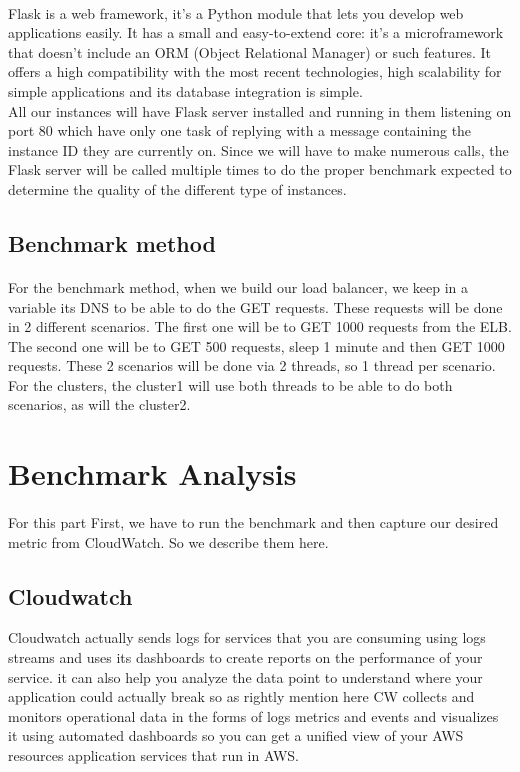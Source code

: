 \documentclass[12pt]{article}
\begin{document}
		\paragraph{} Flask is a web framework, it’s a Python module that lets you develop web applications easily. It has a small 
		and easy-to-extend core: it’s a microframework that doesn’t include an ORM (Object Relational Manager) or such features. It 
		offers a high compatibility with the most recent technologies, high scalability for simple applications and its database 
		integration is simple. \\

		All our instances will have Flask server installed and running in them listening on port 80 which have only one task of replying
		with a message containing the instance ID they are currently on. Since we will have to make numerous calls, the Flask server 
		will be called multiple times to do the proper benchmark expected to determine the quality of the different type of instances.
		\bigskip

	\subsection{Benchmark method}
		\paragraph{} For the benchmark method, when we build our load balancer, we keep in a variable its DNS to be able to do the GET requests.
		These requests will be done in 2 different scenarios. The first one will be to GET 1000 requests from the ELB. The second one will be to 
		GET 500 requests, sleep 1 minute and then GET 1000 requests. These 2 scenarios will be done via 2 threads, so 1 thread per scenario. For 
		the clusters, the cluster1 will use both threads to be able to do both scenarios, as will the cluster2.
		\bigskip
		\pagebreak

\section{Benchmark Analysis} \label{sec:benchmark}
		\paragraph{} For  this part First, we have to run the benchmark and then capture our desired metric from CloudWatch. So we describe them here.
        \subsection{Cloudwatch}
        Cloudwatch actually sends logs for services that you are consuming using logs streams and uses its dashboards to create reports on the 	
		performance of your service. it can also help you analyze the data point to understand where your application could actually break so 
		as rightly mention here CW collects and monitors operational data in the forms of logs metrics and events and visualizes it using 
		automated dashboards  so you can get a unified view of your AWS resources application services that run in AWS.
\end{document}
